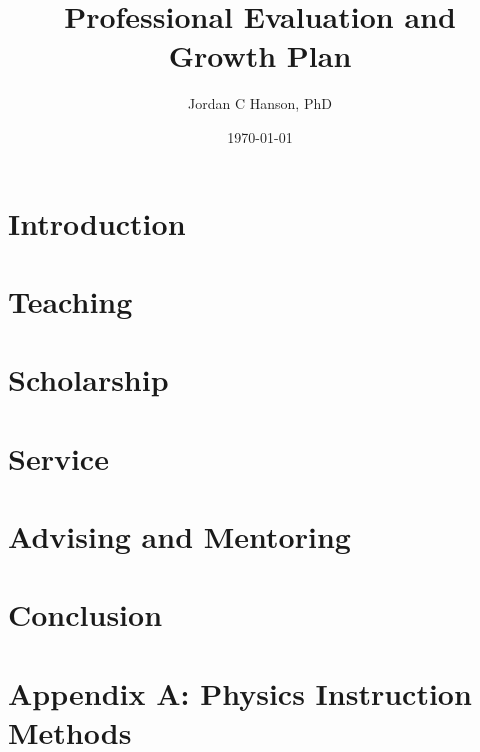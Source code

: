 \documentclass[10pt,oneside]{book}
\title{Professional Evaluation and Growth Plan}
\author{Jordan C Hanson, PhD}
\date{\today}
\begin{document}
\maketitle
\tableofcontents

\chapter{Introduction}
\begin{flushleft}

\end{flushleft}

\chapter{Teaching}
\begin{flushleft}

\end{flushleft}

\chapter{Scholarship}
\begin{flushleft}

\end{flushleft}

\chapter{Service}
\begin{flushleft}

\end{flushleft}

\chapter{Advising and Mentoring}
\begin{flushleft}

\end{flushleft}

\chapter{Conclusion}
\begin{flushleft}

\end{flushleft}

\chapter{Appendix A: Physics Instruction Methods}
\end{document}
